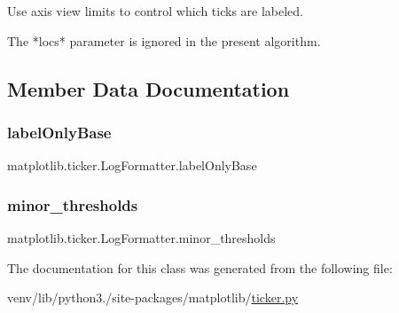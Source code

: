 \begin{DoxyVerb}Use axis view limits to control which ticks are labeled.

The *locs* parameter is ignored in the present algorithm.
\end{DoxyVerb}
 

\subsection{Member Data Documentation}
\mbox{\label{classmatplotlib_1_1ticker_1_1LogFormatter_a7bc43fd53bbbd340f532123f83bcab3c}} 
\subsubsection{\texorpdfstring{label\+Only\+Base}{labelOnlyBase}}
{\footnotesize\ttfamily matplotlib.\+ticker.\+Log\+Formatter.\+label\+Only\+Base}

\mbox{\label{classmatplotlib_1_1ticker_1_1LogFormatter_a8deb464d46fb5534e9a7ec6df8296c3a}} 
\subsubsection{\texorpdfstring{minor\+\_\+thresholds}{minor\_thresholds}}
{\footnotesize\ttfamily matplotlib.\+ticker.\+Log\+Formatter.\+minor\+\_\+thresholds}



The documentation for this class was generated from the following file\+:\begin{DoxyCompactItemize}
\item 
venv/lib/python3./site-\/packages/matplotlib/\hyperlink{ticker_8py}{ticker.\+py}\end{DoxyCompactItemize}
